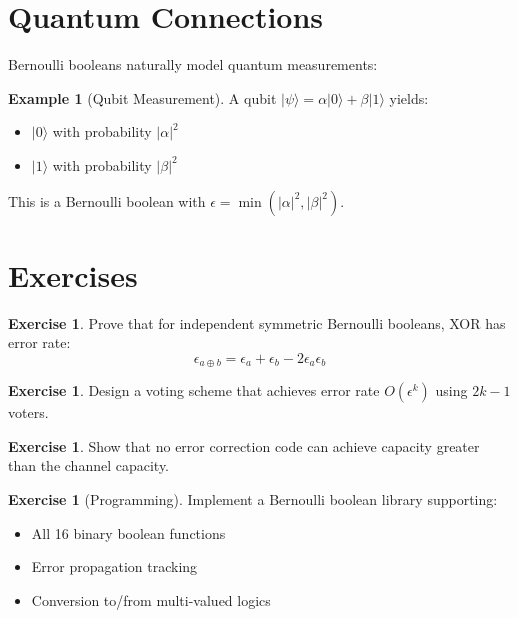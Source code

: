 \documentclass[11pt,twoside,openright]{book}
\theoremstyle{definition}
\newtheorem{example}[definition]{Example}
\newtheorem{exercise}[definition]{Exercise}
\theoremstyle{plain}
\theoremstyle{remark}
\begin{document}
\section{Quantum Connections}

Bernoulli booleans naturally model quantum measurements:

\begin{example}[Qubit Measurement]
A qubit $|\psi\rangle = \alpha|0\rangle + \beta|1\rangle$ yields:
\begin{itemize}
    \item $|0\rangle$ with probability $|\alpha|^2$
    \item $|1\rangle$ with probability $|\beta|^2$
\end{itemize}
This is a Bernoulli boolean with $\epsilon = \min(|\alpha|^2, |\beta|^2)$.
\end{example}

\section{Exercises}

\begin{exercise}
Prove that for independent symmetric Bernoulli booleans, XOR has error rate:
\begin{equation}
\epsilon_{a \oplus b} = \epsilon_a + \epsilon_b - 2\epsilon_a\epsilon_b
\end{equation}
\end{exercise}

\begin{exercise}
Design a voting scheme that achieves error rate $O(\epsilon^k)$ using $2k-1$ voters.
\end{exercise}

\begin{exercise}
Show that no error correction code can achieve capacity greater than the channel capacity.
\end{exercise}

\begin{exercise}[Programming]
Implement a Bernoulli boolean library supporting:
\begin{itemize}
    \item All 16 binary boolean functions
    \item Error propagation tracking
    \item Conversion to/from multi-valued logics
\end{itemize}
\end{exercise}
\end{document}
